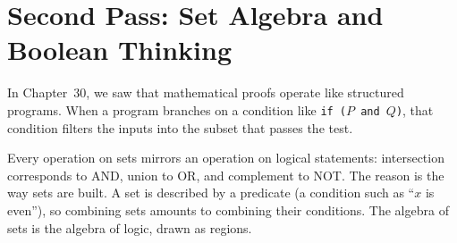 \section{Second Pass: Set Algebra and Boolean Thinking}
\chapterline

In Chapter~30, we saw that mathematical proofs operate like structured programs. When a program branches on a condition like \texttt{if ($P$ and $Q$)}, that condition filters the inputs into the subset that passes the test.

Every operation on sets mirrors an operation on logical statements: intersection corresponds to AND, union to OR, and complement to NOT. The reason is the way sets are built. A set is described by a predicate (a condition such as ``$x$ is even''), so combining sets amounts to combining their conditions. The algebra of sets is the algebra of logic, drawn as regions.

